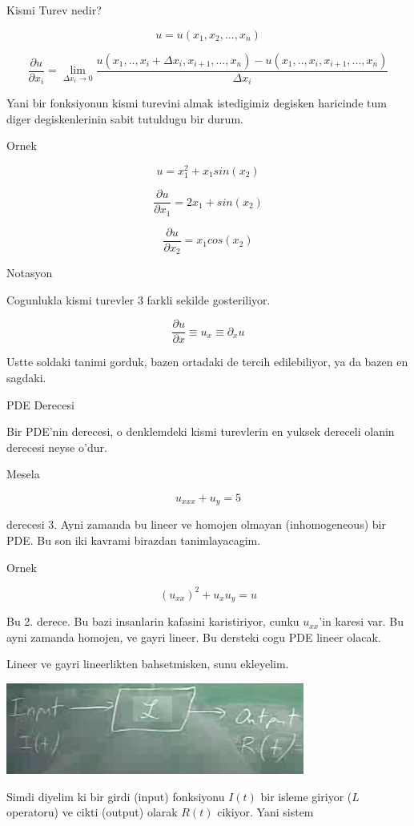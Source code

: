 \documentclass[12pt,fleqn]{article}
\begin{document}
Kismi Turev nedir? 

\[ u = u(x_1, x_2,...,x_n) \]

\[ 
\frac{\partial u}{\partial x_i} = 
\lim_{\Delta x_i \to 0} 
\frac{
u(x_1,..,x_i+\Delta x_i,x_{i+1},...,x_n) - u(x_1,..,x_i,x_{i+1},...,x_n)}
{\Delta x_i}  \]

Yani bir fonksiyonun kismi turevini almak istedigimiz degisken haricinde
tum diger degiskenlerinin sabit tutuldugu bir durum. 

Ornek

\[ u = x_1^2 + x_1sin(x_2) \]

\[ 
\frac{\partial u}{\partial x_1} = 2x_1 + sin(x_2)
 \]

\[ 
\frac{\partial u}{\partial x_2} = x_1 cos(x_2)
 \]

Notasyon

Cogunlukla kismi turevler 3 farkli sekilde gosteriliyor. 

\[ \frac{\partial u}{\partial x} \equiv u_x \equiv \partial_x u \]

Ustte soldaki tanimi gorduk, bazen ortadaki de tercih edilebiliyor, ya da
bazen en sagdaki. 

PDE Derecesi

Bir PDE'nin derecesi, o denklemdeki kismi turevlerin en yuksek dereceli
olanin derecesi neyse o'dur.

Mesela

\[ u_{xxx} + u_y = 5 \]

derecesi 3. Ayni zamanda bu lineer ve homojen olmayan (inhomogeneous) bir
PDE. Bu son iki kavrami birazdan tanimlayacagim. 

Ornek 

\[ (u_{xx})^2 + u_xu_y = u \]

Bu 2. derece. Bu bazi insanlarin kafasini karistiriyor, cunku $u_{xx}$'in
karesi var. Bu ayni zamanda homojen, ve gayri lineer. Bu dersteki cogu PDE
lineer olacak. 

Lineer ve gayri lineerlikten bahsetmisken, sunu ekleyelim. 

\includegraphics[height=3cm]{1_5.png}

Simdi diyelim ki bir girdi (input) fonksiyonu $I(t)$ bir isleme giriyor
($L$ operatoru) ve cikti (output) olarak $R(t)$ cikiyor. Yani sistem
\end{document}
